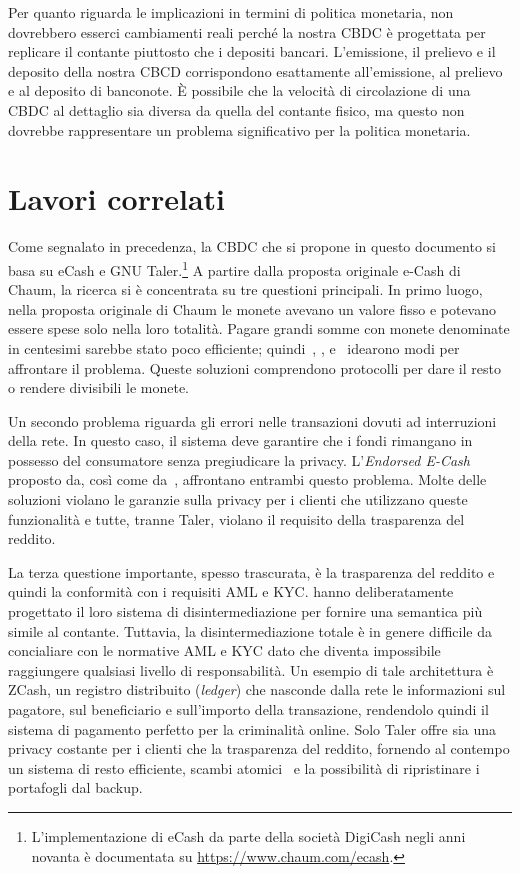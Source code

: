 \documentclass{article}
\begin{document}
Per quanto riguarda le implicazioni in termini di politica monetaria, 
non dovrebbero esserci cambiamenti reali perché la nostra CBDC è 
progettata per replicare il contante piuttosto che i depositi bancari. 
L'emissione, il prelievo e il deposito della nostra CBCD corrispondono 
esattamente all'emissione, al prelievo e al deposito di banconote. È 
possibile che la velocità di circolazione di una CBDC al dettaglio sia 
diversa da quella del contante fisico, ma questo non dovrebbe 
rappresentare un problema significativo per la politica monetaria.

\hypertarget{lavori-correlati}{%
\section{Lavori correlati}\label{6.-lavori-correlati}}

Come segnalato in precedenza, la CBDC che si propone in questo documento 
si basa su eCash e GNU Taler.\footnote{L'implementazione di eCash 
da parte della società DigiCash negli anni novanta è documentata su 
\url{https://www.chaum.com/ecash}.} A partire dalla proposta originale 
e-Cash di Chaum, la ricerca si è concentrata su tre questioni principali. 
In primo luogo, nella proposta originale di Chaum le monete avevano un 
valore fisso e potevano essere spese solo nella loro totalità. Pagare 
grandi somme con monete denominate in centesimi sarebbe stato poco 
efficiente; quindi~\cite{Okamoto}, \cite{Camenisch2005}, \cite{Canard} 
e~\cite{Dold} idearono modi per affrontare il problema. Queste soluzioni 
comprendono protocolli per dare il resto o rendere divisibili le monete.

Un secondo problema riguarda gli errori nelle transazioni dovuti ad 
interruzioni della rete. In questo caso, il sistema deve garantire che 
i fondi rimangano in possesso del consumatore senza pregiudicare la 
privacy. L'\textit{Endorsed E-Cash} proposto da\cite{Camenisch2007}, 
così come da~\cite{Dold}, affrontano entrambi questo problema. Molte 
delle soluzioni violano le garanzie sulla privacy per i clienti che 
utilizzano queste funzionalità e tutte, tranne Taler, violano il 
requisito della trasparenza del reddito.

La terza questione importante, spesso trascurata, è la trasparenza del 
reddito e quindi la conformità con i requisiti AML e KYC. \cite{Fuchsbauer} 
hanno deliberatamente progettato il loro sistema di disintermediazione 
per fornire una semantica più simile al contante. Tuttavia, la 
disintermediazione totale è in genere difficile da concialiare con le 
normative AML e KYC dato che diventa impossibile raggiungere qualsiasi 
livello di responsabilità. Un esempio di tale architettura è ZCash, un 
registro distribuito (\textit{ledger}) che nasconde dalla rete le 
informazioni sul pagatore, sul beneficiario e sull'importo della 
transazione, rendendolo quindi il sistema di pagamento perfetto per la 
criminalità online. Solo Taler offre sia una privacy costante per i 
clienti che la trasparenza del reddito, fornendo al contempo un sistema 
di resto efficiente, scambi atomici~\cite[vedi][]{Camenisch2007} e la 
possibilità di ripristinare i portafogli dal backup.
\end{document}
